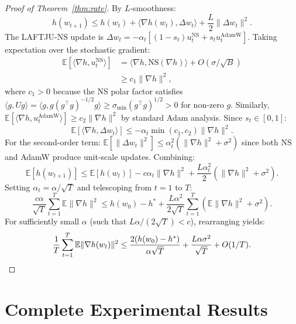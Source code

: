 \documentclass[10pt,twocolumn]{article}
\newcommand{\method}{LAFTJU}
\newcommand{\E}{\mathbb{E}}
\begin{document}
\begin{proof}[Proof of Theorem~\ref{thm:rate}]
By $L$-smoothness:
\begin{equation*}
h(w_{t+1}) \leq h(w_t) + \langle \nabla h(w_t), \Delta w_t \rangle + \frac{L}{2}\|\Delta w_t\|^2.
\end{equation*}
The \method{}-NS update is $\Delta w_t = -\alpha_t[(1-s_t)u_t^{\mathrm{NS}} + s_t u_t^{\mathrm{AdamW}}]$. Taking expectation over the stochastic gradient:
\begin{align*}
\E[\langle \nabla h, u_t^{\mathrm{NS}} \rangle] &= \langle \nabla h, \mathrm{NS}(\nabla h) \rangle + O(\sigma/\sqrt{B}) \\
&\geq c_1 \|\nabla h\|^2,
\end{align*}
where $c_1 > 0$ because the NS polar factor satisfies $\langle g, Ug \rangle = \langle g, g(g^\top g)^{-1/2}g \rangle \geq \sigma_{\min}(g^\top g)^{1/2} > 0$ for non-zero $g$. Similarly, $\E[\langle \nabla h, u_t^{\mathrm{AdamW}} \rangle] \geq c_2 \|\nabla h\|^2$ by standard Adam analysis. Since $s_t \in [0,1]$:
\begin{equation*}
\E[\langle \nabla h, \Delta w_t \rangle] \leq -\alpha_t \min(c_1, c_2) \|\nabla h\|^2.
\end{equation*}
For the second-order term: $\E[\|\Delta w_t\|^2] \leq \alpha_t^2(\|\nabla h\|^2 + \sigma^2)$ since both NS and AdamW produce unit-scale updates. Combining:
\begin{equation*}
\E[h(w_{t+1})] \leq \E[h(w_t)] - c\alpha_t\|\nabla h\|^2 + \frac{L\alpha_t^2}{2}(\|\nabla h\|^2 + \sigma^2).
\end{equation*}
Setting $\alpha_t = \alpha/\sqrt{T}$ and telescoping from $t=1$ to $T$:
\begin{equation*}
\frac{c\alpha}{\sqrt{T}}\sum_{t=1}^T \E\|\nabla h\|^2 \leq h(w_0) - h^* + \frac{L\alpha^2}{2\sqrt{T}}\sum_{t=1}^T(\E\|\nabla h\|^2 + \sigma^2).
\end{equation*}
For sufficiently small $\alpha$ (such that $L\alpha/(2\sqrt{T}) < c$), rearranging yields:
\begin{equation*}
\frac{1}{T}\sum_{t=1}^T \E\|\nabla h(w_t)\|^2 \leq \frac{2(h(w_0)-h^*)}{\alpha\sqrt{T}} + \frac{L\alpha\sigma^2}{\sqrt{T}} + O(1/T). \qedhere
\end{equation*}
\end{proof}

\section{Complete Experimental Results}
\end{document}
